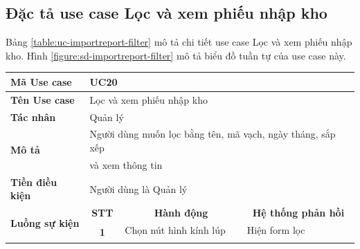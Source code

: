 \documentclass[../DoAn.tex]{subfiles}
\begin{document}
\subsection{Đặc tả use case Lọc và xem phiếu nhập kho}
\label{section:uc-importreport-filter}
Bảng \ref{table:uc-importreport-filter} mô tả chi tiết use case Lọc và xem phiếu nhập kho. Hình \ref{figure:sd-importreport-filter} mô tả biểu đồ tuần tự của use case này.
\begin{table}[H]
    \begin{tabular}{|l|c|l|l|}
        \hline
        \textbf{Mã Use case}                    & \multicolumn{3}{l|}{UC20}                                                                                                                                                   \\ \hline
        \textbf{Tên Use case}                   & \multicolumn{3}{l|}{Lọc và xem phiếu nhập kho}                                                                                                                              \\ \hline
        \textbf{Tác nhân}                       & \multicolumn{3}{l|}{Quản lý}                                                                                                                                                \\ \hline
        \multirow{2}{*}{\textbf{Mô tả} }        & \multicolumn{3}{l|}{Người dùng muốn lọc bằng tên, mã vạch, ngày tháng, sắp xếp}                                                                                             \\
                                                & \multicolumn{3}{l|}{và xem thông tin}                                                                                                                                       \\ \hline
        \textbf{Tiền điều kiện}                 & \multicolumn{3}{l|}{Người dùng là Quản lý}                                                                                                                                  \\ \hline
        \multirow{7}{*}{\textbf{Luồng sự kiện}} & \multicolumn{1}{c|}{\textbf{STT}}                                               & \multicolumn{1}{c|}{\textbf{Hành động}} & \multicolumn{1}{c|}{\textbf{Hệ thống phản hồi}} \\ \cline{2-4}
                                                & \multirow{6}{*}{\textbf{1}}                                                     & Chọn nút hình kính lúp                  & Hiện form lọc                                   \\ \cline{3-4}

\end{tabular}
\end{table}
\end{document}
